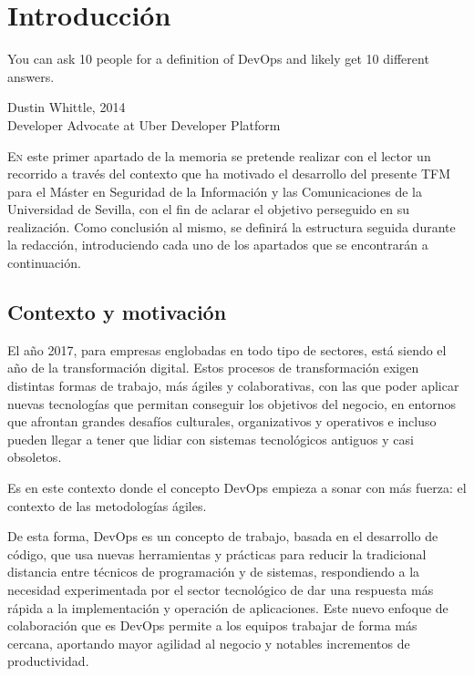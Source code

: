 \chapter{Introducción}\label{chp-01}
\epigraph{You can ask 10 people for a definition of DevOps and likely get 10 different answers.}{Dustin Whittle, 2014\\Developer Advocate at Uber Developer Platform}

\lettrine[lraise=-0.1, lines=2, loversize=0.2]{E}{n} este primer apartado de la memoria se pretende realizar con el lector un recorrido a través del contexto que ha motivado el desarrollo del presente \gls{TFM} para el Máster en Seguridad de la Información y las Comunicaciones  de la Universidad de Sevilla, con el fin de aclarar el objetivo perseguido en su realización. Como conclusión al mismo, se definirá la estructura seguida durante la redacción, introduciendo cada uno de los apartados que se encontrarán a continuación. 

\section{Contexto y motivación}

El año 2017, para empresas englobadas en todo tipo de sectores, está siendo el año de la transformación digital. Estos procesos de transformación exigen distintas formas de trabajo, más ágiles y colaborativas, con las que poder aplicar nuevas tecnologías que permitan conseguir los objetivos del negocio, en entornos que afrontan grandes desafíos culturales, organizativos y operativos e incluso pueden llegar a tener que lidiar con sistemas tecnológicos antiguos y casi obsoletos\cite{expansion2017}. 

Es en este contexto donde el concepto \gls{DevOps} empieza a sonar con más fuerza: el contexto de las metodologías ágiles. 

De esta forma, \gls{DevOps} es un concepto de trabajo, basada en el desarrollo de código, que usa nuevas herramientas y prácticas para reducir la tradicional distancia entre técnicos de programación y de sistemas, respondiendo a la necesidad experimentada por el sector tecnológico de dar una respuesta más rápida a la implementación y operación de aplicaciones. Este nuevo enfoque de colaboración que es \gls{DevOps} permite a los equipos trabajar de forma más cercana, aportando mayor agilidad al negocio y notables incrementos de productividad.

